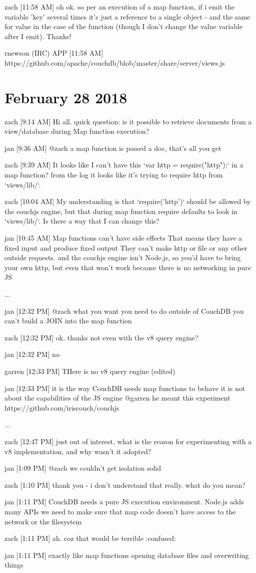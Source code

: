 zach [11:58 AM]
oh ok. so per an execution of a map function, if i emit the variable 'key' several times it's just a reference to a single object - and the same for value in the case of the function (though I don't change the value variable after I emit). Thanks!

rnewson (IRC) APP [11:58 AM]
https://github.com/apache/couchdb/blob/master/share/server/views.js


\section{February 28 2018}
\label{slack-28-feb}
zach [9:14 AM]
Hi all. quick question: is it possible to retrieve documents from a view/database during Map function execution?

jan [9:36 AM]
@zach a map function is passed a doc, that's all you get

zach [9:39 AM]
It looks like I can't have this `var http = require("http");` in a map function?
from the log it looks like it's trying to require http from `views/lib/`.

zach [10:04 AM]
My understanding is that `require('http')` should be allowed by the couchjs engine, but that during map function require defaults to look in `views/lib/`. Is there a way that I can change this?

jan [10:45 AM]
Map functions can't have side effects
That means they have a fixed input and produce fixed output
They can't make http or file or any other outside requests.
and the couchjs engine isn't Node.js, so you'd have to bring your own http, but even that won't work because there is no networking in pure JS

...

jan [12:32 PM]
@zach what you want you need to do outside of CouchDB
you can’t build a JOIN into the map function

zach [12:32 PM]
ok. thanks
not even with the v8 query engine?

jan [12:32 PM]
no

garren [12:33 PM]
THere is no v8 query engine (edited)

jan [12:33 PM]
it is the way CouchDB needs map functions to behave
it is not about the capabilities of the JS engine
@garren he meant this experiment https://github.com/iriscouch/couchjs


...

zach [12:47 PM]
just out of interest, what is the reason for experimenting with a v8 implementation, and why wasn't it adopted?

jan [1:09 PM]
@zach we couldn’t get isolation solid

zach [1:10 PM]
thank you - i don't understand that really. what do you mean?

jan [1:11 PM]
CouchDB needs a pure JS execution environment. Node.js adds many APIs
we need to make sure that map code doesn’t have access to the network or the filesystem

zach [1:11 PM]
ah. coz that would be terrible :confused:

jan [1:11 PM]
exactly
like map functions opening database files and overwriting things